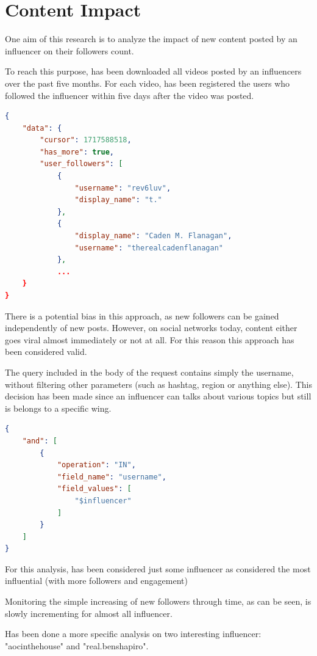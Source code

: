 \section{Content Impact}

One aim of this research is to analyze the impact of new content posted by an influencer on their followers count.

To reach this purpose, has been downloaded all videos posted by an influencers over the past five months. For each video, has been registered the users who followed the influencer within five days after the video was posted.

\begin{lstlisting}[language=json]
{
    "data": {
        "cursor": 1717588518,
        "has_more": true,
        "user_followers": [
            {
                "username": "rev6luv",
                "display_name": "t."
            },
            {
                "display_name": "Caden M. Flanagan",
                "username": "therealcadenflanagan"
            },
            ...
    }
} 
\end{lstlisting}

There is a potential bias in this approach, as new followers can be gained independently of new posts. However, on social networks today, content either goes viral almost immediately or not at all. For this reason this approach has been considered valid.

The query included in the body of the request contains simply the username, without filtering other parameters (such as hashtag, region or anything else). This decision has been made since an influencer can talks about various topics but still is belongs to a specific wing. 

\begin{lstlisting}[language=json, label={lst:query}]
{
    "and": [
        {
            "operation": "IN",
            "field_name": "username",
            "field_values": [
                "$influencer" 
            ]
        }
    ]
}
\end{lstlisting}

For this analysis, has been considered just some influencer as considered the most influential (with more followers and engagement)

Monitoring the simple increasing of new followers through time, as can be seen, is slowly incrementing for almost all influencer.

Has been done a more specific analysis on two interesting influencer: "aocinthehouse" and "real.benshapiro".

